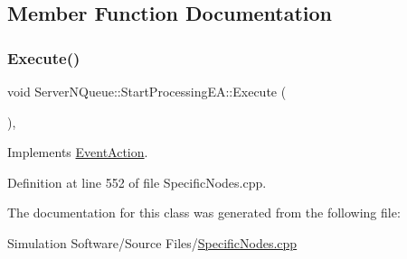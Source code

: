 \subsection{Member Function Documentation}
\mbox{\label{class_server_n_queue_1_1_start_processing_e_a_a734000fd4380b39594df88706f674dd0}} 
\subsubsection{\texorpdfstring{Execute()}{Execute()}}
{\footnotesize\ttfamily void Server\+N\+Queue\+::\+Start\+Processing\+E\+A\+::\+Execute (\begin{DoxyParamCaption}{ }\end{DoxyParamCaption})\hspace{0.3cm}{\ttfamily [inline]}, {\ttfamily [virtual]}}



Implements \hyperlink{class_event_action_a62b9d07abb4ca8e7c078b076a1ab1a9f}{Event\+Action}.



Definition at line 552 of file Specific\+Nodes.\+cpp.



The documentation for this class was generated from the following file\+:\begin{DoxyCompactItemize}
\item 
Simulation Software/\+Source Files/\hyperlink{_specific_nodes_8cpp}{Specific\+Nodes.\+cpp}\end{DoxyCompactItemize}
